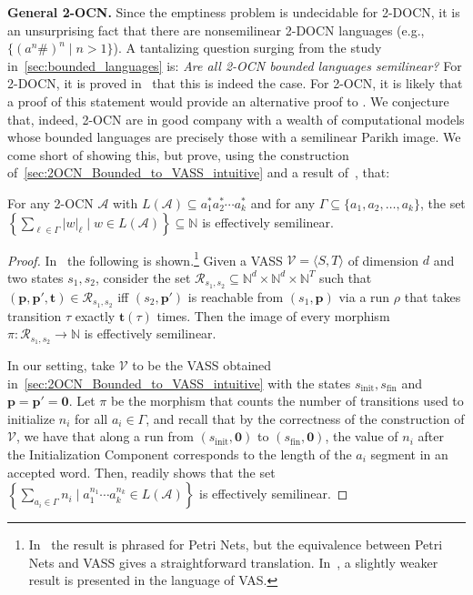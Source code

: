 \documentclass[USenglish]{lipics-v2021}
\newcommand{\tup}[1]{\langle #1 \rangle}
\renewcommand{\vec}[1]{\boldsymbol{#1}}
\newcommand{\bbN}{\mathbb{N}}
\newcommand{\cA}{\mathcal{A}}
\newcommand{\cV}{\mathcal{V}}
\newcommand{\cR}{\mathcal{R}}
\newcommand{\mysubparagraph}[1]{\noindent \textbf{\textsf{#1}} }
\begin{document}
\mysubparagraph{General 2-OCN.}  Since the emptiness problem is undecidable for
2-DOCN, it is an unsurprising fact that there are nonsemilinear 2-DOCN languages
(e.g., \(\{(a^n\#)^n \mid n > 1\}\)).  A tantalizing question surging from the study in~\cref{sec:bounded_languages} is: \emph{Are all 2-OCN bounded languages semilinear?}  
For 2-DOCN, it is proved in~\cite{miyano1982two} that this is indeed the case. For 2-OCN, it is likely that a proof of this statement would provide an alternative proof to .  We conjecture that, indeed, 2-OCN
are in good company with a wealth of computational models whose bounded
languages are precisely those with a semilinear Parikh image.  We come short of
showing this, but prove, using the construction
of~\cref{sec:2OCN_Bounded_to_VASS_intuitive} and a result
of~\cite{hauschildt1994petri}, that:
\begin{theorem}
	\label{thm:singleton_alphabet_semilinear} For any 2-OCN $\cA$ with \(L(\cA) \subseteq
	a_1^*a_2^*\cdots a_k^*\) and for any \(\Gamma \subseteq \{a_1, a_2, \ldots, a_k\}\), the set $\left\{ \sum_{\ell \in \Gamma}
	|w|_\ell \mid w \in L(\cA)\right\}\subseteq \bbN$ is effectively semilinear.
\end{theorem}
\begin{proof} In~\cite[Corollary 4.3]{hauschildt1994petri} the following is
	shown.\footnote{In~\cite{hauschildt1994petri} the result is phrased for Petri
		Nets, but the equivalence between Petri Nets and VASS gives a straightforward
		translation.  In~\cite{kleinebuning1989}, a slightly weaker result is
		presented in the language of VAS.} Given a VASS $\cV=\tup{S,T}$ of dimension
	$d$ and two states $s_1,s_2$, consider the set $\cR_{s_1,s_2}\subseteq \bbN^d\times \bbN^d\times
	\bbN^T$ such that $(\vec{p},\vec{p'},\vec{t})\in \cR_{s_1,s_2}$ iff
	$(s_2,\vec{p'})$ is reachable from $(s_1,\vec{p})$ via a run $\rho$ that takes
	transition $\tau$ exactly $\vec{t}(\tau)$ times. Then the image of every morphism
	$\pi\colon \cR_{s_1,s_2}\to \bbN$ is effectively semilinear.
	
	In our setting, take $\cV$ to be the VASS obtained
	in~\cref{sec:2OCN_Bounded_to_VASS_intuitive} with the states
	$s_{\textrm{init}}, s_{\textrm{fin}}$ and $\vec{p}=\vec{p'}=\vec{0}$. Let
	$\pi$ be the morphism that counts the number of transitions used to initialize
	$n_i$ for all $a_i \in \Gamma$, and recall that by the correctness of the
	construction of $\cV$, we have that along a run from
	$(s_{\textrm{init}},\vec{0})$ to $(s_{\textrm{fin}},\vec{0})$, the value of
	$n_i$ after the Initialization Component corresponds to the length of the
	$a_i$ segment in an accepted word.  Then, \cite[Corollary
	4.3]{hauschildt1994petri} readily shows that the set
	$\left\{\sum_{a_i \in \Gamma} n_i \mid a_1^{n_1}\cdots a_k^{n_k}\in L(\cA)\right\}$ is effectively
	semilinear.
\end{proof}
\end{document}
